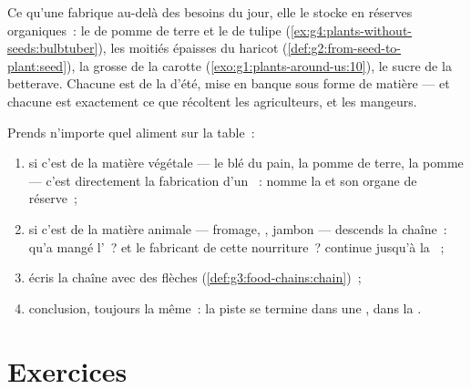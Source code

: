 \begin{example}\label{ex:g6:plants-are-producers:pantry}
Ce qu'une  fabrique au-delà des besoins du jour, elle le
stocke en réserves organiques~: le  de pomme de terre et le
 de tulipe
(\cref{ex:g4:plants-without-seeds:bulbtuber}), les moitiés épaisses
du haricot (\cref{def:g2:from-seed-to-plant:seed}), la grosse 
de la carotte (\cref{exo:g1:plants-around-us:10}), le sucre de la
betterave. Chacune est de la  d'été, mise en banque sous
forme de matière --- et chacune est exactement ce que récoltent les
agriculteurs, et les mangeurs.
\end{example}

\begin{method}\label{met:g6:plants-are-producers:trace}
Prends n'importe quel aliment sur la table~:
\begin{enumerate}
  \item si c'est de la matière végétale --- le blé du pain, la
        pomme de terre, la pomme --- c'est directement la
        fabrication d'un ~: nomme la  et son organe
        de réserve~;
  \item si c'est de la matière animale --- fromage, , jambon ---
        descends la chaîne~: qu'a mangé l'~? et le fabricant
        de cette nourriture~? continue jusqu'à la ~;
  \item écris la chaîne avec des flèches
        (\cref{def:g3:food-chains:chain})~;
  \item conclusion, toujours la même~: la piste se termine dans une
        , dans la .
\end{enumerate}
\end{method}

\section{Exercices}

